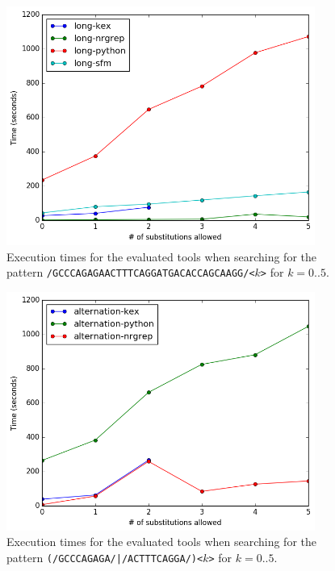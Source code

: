 \begin{figure}[!ht]
  \centering
  \includegraphics[width=0.9\textwidth]{images/long.png}
  \caption{Execution times for the evaluated tools when searching for the
    pattern \texttt{/GCCCAGAGAACTTTCAGGATGACACCAGCAAGG/<$k$>} for $k=0..5$.}
  \label{fig:long}
\end{figure}

\begin{figure}[!ht]
  \centering
  \includegraphics[width=0.9\textwidth]{images/alternation.png}
  \caption{Execution times for the evaluated tools when searching for the
    pattern \texttt{(/GCCCAGAGA/|/ACTTTCAGGA/)<$k$>} for $k=0..5$.}
  \label{fig:alternation}
\end{figure}

